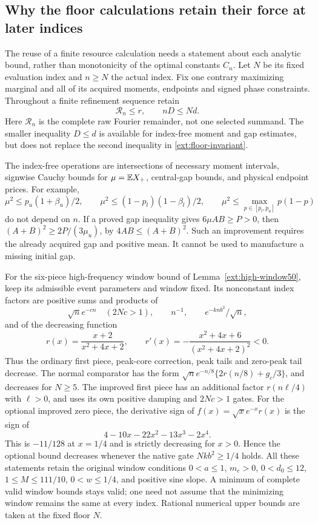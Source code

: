\subsection{Why the floor calculations retain their force at later indices}
\label{ext:finite-floor-transfer}
The reuse of a finite resource calculation needs a statement about each
analytic bound, rather than monotonicity of the optimal constants $C_n$.
Let $N$ be its fixed evaluation index and $n\ge N$ the actual index.
Fix one contrary maximizing marginal and all of its acquired moments,
endpoints and signed phase constraints. Throughout a finite refinement
sequence retain
\begin{equation}\label{ext:floor-invariant}
 \mathcal R_n\le r,\qquad nD\le Nd.
\end{equation}
Here $\mathcal R_n$ is the complete raw Fourier remainder, not one
selected summand. The smaller inequality $D\le d$ is available for
index-free moment and gap estimates, but does not replace the second
inequality in \eqref{ext:floor-invariant}.

The index-free operations are intersections of necessary moment
intervals, signwise Cauchy bounds for $\mu=\mathbb E X_+$, central-gap
bounds, and physical endpoint prices. For example,
\[
 \mu^2\le p_u(1+\beta_u)/2,\qquad
 \mu^2\le(1-p_l)(1-\beta_l)/2,\qquad
 \mu^2\le\max_{p\in[p_l,p_u]}p(1-p)
\]
do not depend on $n$. If a proved gap inequality gives $6\mu AB\ge P>0$,
then $(A+B)^2\ge2P/(3\mu_u)$, by $4AB\le(A+B)^2$.
Such an improvement requires the already acquired gap and positive mean.
It cannot be used to manufacture a missing initial gap.

For the six-piece high-frequency window bound of Lemma~\ref{ext:high-window50}, keep its admissible
event parameters and window fixed. Its nonconstant index factors are
positive sums and products of
\[
 \sqrt n e^{-cn}\quad(2Nc>1),\qquad n^{-1},\qquad
 e^{-knb^2}/\sqrt n,
\]
and of the decreasing function
\[
 r(x)=\frac{x+2}{x^2+4x+2},\qquad
 r'(x)=-\frac{x^2+4x+6}{(x^2+4x+2)^2}<0.
\]
Thus the ordinary first piece, peak-core correction, peak tails and
zero-peak tail decrease. The normal comparator has the form
$\sqrt n e^{-n/8}\{2r(n/8)+g_c/3\}$, and decreases for $N\ge5$.
The improved first piece has an additional factor $r(n\ell/4)$
with $\ell>0$, and uses its own positive damping and $2Nc>1$ gates.
For the optional improved zero piece, the derivative sign of
$f(x)=\sqrt{x}e^{-x}r(x)$ is the sign of
\[
 4-10x-22x^2-13x^3-2x^4.
\]
This is $-11/128$ at $x=1/4$ and is strictly decreasing for $x>0$.
Hence the optional bound decreases whenever the native gate
$Nkb^2\ge1/4$ holds. All these statements retain the original
window conditions $0<a\le1$, $m_e>0$, $0<d_0\le12$,
$1\le M\le111/10$, $0<w\le1/4$, and positive sine slope.
A minimum of complete valid window bounds stays valid; one need not
assume that the minimizing window remains the same at every index.
Rational numerical upper bounds are taken at the fixed floor $N$.

